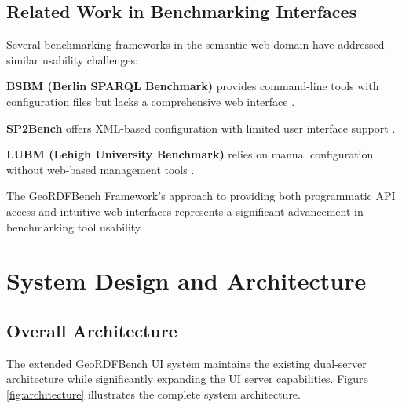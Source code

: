 \documentclass[11pt,a4paper]{article}
\begin{document}
\subsection{Related Work in Benchmarking Interfaces}

Several benchmarking frameworks in the semantic web domain have addressed similar usability challenges:

\textbf{BSBM (Berlin SPARQL Benchmark)} provides command-line tools with configuration files but lacks a comprehensive web interface \cite{bsbm2009}.

\textbf{SP2Bench} offers XML-based configuration with limited user interface support \cite{sp2bench2009}.

\textbf{LUBM (Lehigh University Benchmark)} relies on manual configuration without web-based management tools \cite{lubm2005}.

The GeoRDFBench Framework's approach to providing both programmatic API access and intuitive web interfaces represents a significant advancement in benchmarking tool usability.

\section{System Design and Architecture}

\subsection{Overall Architecture}

The extended GeoRDFBench UI system maintains the existing dual-server architecture while significantly expanding the UI server capabilities. Figure \ref{fig:architecture} illustrates the complete system architecture.
\end{document}

